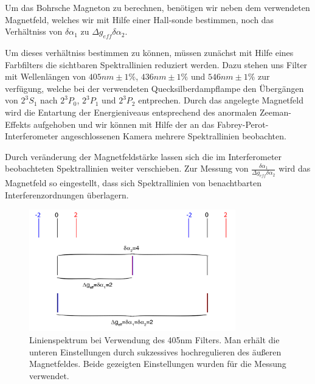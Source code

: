 \documentclass[bigchapter,colorback,accentcolor=tud4b,linedtoc,11pt]{tudreport}
\begin{document}
Um das Bohrsche Magneton zu berechnen, benötigen wir neben dem verwendeten
Magnetfeld, welches wir mit Hilfe einer Hall-sonde bestimmen, noch das
Verhältniss von $\delta\alpha_1$ zu $\Delta g_{eff} \delta\alpha_2$.

Um dieses verhältniss bestimmen zu können, müssen zunächst mit Hilfe eines
Farbfilters die sichtbaren Spektrallinien reduziert werden. Dazu stehen uns Filter
mit Wellenlängen von $405 nm \pm 1\%$, $436 nm \pm 1\%$ und $546 nm \pm 1\%$
zur verfügung, welche bei der verwendeten Quecksilberdampflampe den Übergängen von
$2^3S_1$ nach $2^3P_0$, $2^3P_1$ und $2^3P_2$ entprechen. Durch das angelegte
Magnetfeld wird die Entartung der Energieniveaus entsprechend des anormalen
Zeeman-Effekts aufgehoben und wir können mit Hilfe der an das
Fabrey-Perot-Interferometer angeschlossenen Kamera mehrere
Spektrallinien beobachten.

Durch veränderung der Magnetfeldstärke lassen sich die im Interferometer
beobachteten Spektrallinien weiter verschieben. Zur Messung von
$\frac{\delta\alpha_1}{\Delta g_{eff} \delta\alpha_2}$ wird das Magnetfeld so
eingestellt, dass sich Spektrallinien von benachtbarten Interferenzordnungen
überlagern. 

\begin{figure}[H] 
  \centering
     \includegraphics[width=0.8\textwidth]{img/linienspektrum405.png}
  \caption{Linienspektrum bei Verwendung des 405nm Filters. Man erhält die
    unteren Einstellungen durch sukzessives hochregulieren des äußeren Magnetfeldes. Beide gezeigten
    Einstellungen wurden für die Messung verwendet.}
  \label{fig:405nmlines}
\end{figure}
\end{document}
